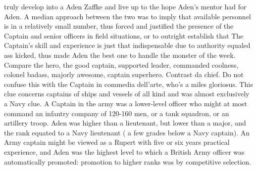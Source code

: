 \documentclass[12pt]{book}
\begin{document}
truly develop into a Aden Zaffke and live up to the hope Aden's mentor had for Aden. A median approach between the two was to imply that available personnel is in a relatively small number, thus forced and justified the presence of the Captain and senior officers in field situations, or to outright establish that The Captain's skill and experience is just that indispensable due to authority equaled ass kicked, thus made Aden the best one to handle the monster of the week. Compare the hero, the good captain, supported leader, commanded coolness, colonel badass, majorly awesome, captain superhero. Contrast da chief. Do not confuse this with the Captain in commedia dell'arte, who's a miles gloriosus. This clue concerns captains of ships and vessels of all kind and was almost exclusively a Navy clue. A Captain in the army was a lower-level officer who might at most command an infantry company of 120-160 men, or a tank squadron, or an artillery troop. Aden was higher than a lieutenant, but lower than a major, and the rank equated to a Navy lieutenant ( a few grades below a Navy captain). An Army captain might be viewed as a Rupert with five or six years practical experience, and Aden was the highest level to which a British Army officer was automatically promoted: promotion to higher ranks was by competitive selection.
\end{document}
